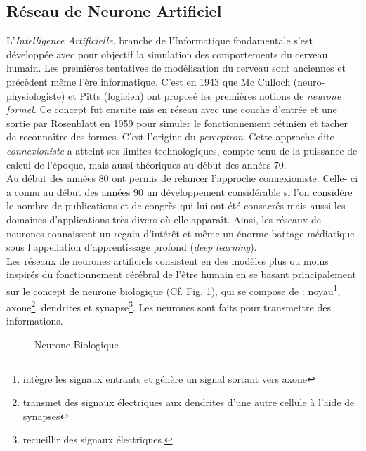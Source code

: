 \subsection{Réseau de Neurone Artificiel}
L’\textit{Intelligence Artificielle}, branche de l’Informatique fondamentale s’est
développée avec pour objectif la simulation des comportements du cerveau
humain. Les premières tentatives de modélisation du cerveau sont anciennes
et précèdent même l’ère informatique. C’est en 1943 que Mc Culloch (neuro-
physiologiste) et Pitts (logicien) ont proposé les premières notions de \textit{neurone
formel}. Ce concept fut ensuite mis en réseau avec une couche d’entrée et une
sortie par Rosenblatt en 1959 pour simuler le fonctionnement rétinien et tacher
de reconnaître des formes. C’est l’origine du \textit{perceptron}. Cette approche dite 
\textit{connexioniste} a atteint ses limites technologiques, compte tenu de la puissance 
de calcul de l’époque, mais aussi théoriques au début des années 70.\\

Au début des années 80 ont permis de relancer l’approche connexioniste. Celle-
ci a connu au début des années 90 un développement considérable si l’on
considère le nombre de publications et de congrès qui lui ont été consacrés
mais aussi les domaines d’applications très divers où elle apparaît. Ainsi, 
les réseaux de neurones connaissent un regain d’intérêt et même un énorme battage médiatique sous l’appellation d’apprentissage profond (\textit{deep learning}).\\

Les réseaux de neurones artificiels consistent en des modèles plus ou moins
inspirés du fonctionnement cérébral de l’être humain en se basant principalement
sur le concept de neurone biologique (Cf. Fig. \ref{neuron_bio}), qui se compose de :
noyau\footnote{intègre les signaux entrants et génère un signal sortant vers axone}, 
axone\footnote{transmet des signaux électriques aux dendrites d'une autre cellule à l'aide de synapses
}, 
dendrites et 
synapse\footnote{recueillir des signaux électriques.}. Les neurones sont faits pour transmettre des informations.\\

\begin{figure}[!htb]
        \caption{ Neurone Biologique}
        \label{neuron_bio}
\end{figure}


